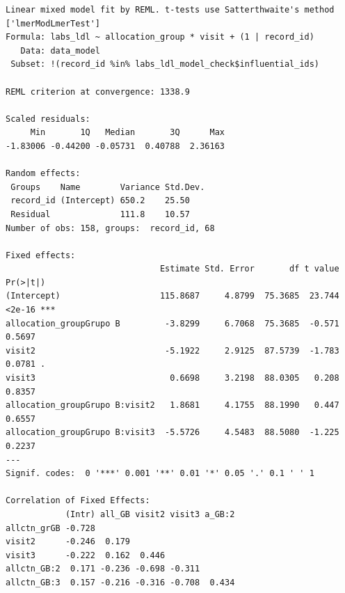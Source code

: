 \documentclass[
  12pt,
]{article}
\newenvironment{Shaded}{\begin{snugshade}}{\end{snugshade}}
\newcommand{\NormalTok}[1]{\textcolor[rgb]{0.00,0.23,0.31}{#1}}
\newcommand{\SpecialCharTok}[1]{\textcolor[rgb]{0.37,0.37,0.37}{#1}}
\begin{document}
\begin{verbatim}
Linear mixed model fit by REML. t-tests use Satterthwaite's method ['lmerModLmerTest']
Formula: labs_ldl ~ allocation_group * visit + (1 | record_id)
   Data: data_model
 Subset: !(record_id %in% labs_ldl_model_check$influential_ids)

REML criterion at convergence: 1338.9

Scaled residuals: 
     Min       1Q   Median       3Q      Max 
-1.83006 -0.44200 -0.05731  0.40788  2.36163 

Random effects:
 Groups    Name        Variance Std.Dev.
 record_id (Intercept) 650.2    25.50   
 Residual              111.8    10.57   
Number of obs: 158, groups:  record_id, 68

Fixed effects:
                               Estimate Std. Error       df t value Pr(>|t|)    
(Intercept)                    115.8687     4.8799  75.3685  23.744   <2e-16 ***
allocation_groupGrupo B         -3.8299     6.7068  75.3685  -0.571   0.5697    
visit2                          -5.1922     2.9125  87.5739  -1.783   0.0781 .  
visit3                           0.6698     3.2198  88.0305   0.208   0.8357    
allocation_groupGrupo B:visit2   1.8681     4.1755  88.1990   0.447   0.6557    
allocation_groupGrupo B:visit3  -5.5726     4.5483  88.5080  -1.225   0.2237    
---
Signif. codes:  0 '***' 0.001 '**' 0.01 '*' 0.05 '.' 0.1 ' ' 1

Correlation of Fixed Effects:
            (Intr) all_GB visit2 visit3 a_GB:2
allctn_grGB -0.728                            
visit2      -0.246  0.179                     
visit3      -0.222  0.162  0.446              
allctn_GB:2  0.171 -0.236 -0.698 -0.311       
allctn_GB:3  0.157 -0.216 -0.316 -0.708  0.434
\end{verbatim}

\begin{Shaded}
\end{Shaded}
\end{document}

